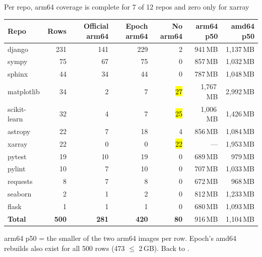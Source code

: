 \begin{frame}{Per repo, arm64 coverage is complete for 7 of 12 repos and zero only for xarray}
\scriptsize\setlength{\tabcolsep}{5pt}
\begin{tabular}{@{}lrrrrrr@{}}
\toprule
\textbf{Repo} & \textbf{Rows} & \textbf{Official arm64} & \textbf{Epoch arm64} & \textbf{No arm64} & \textbf{arm64 p50} & \textbf{amd64 p50}\\
\midrule
django & 231 & 141 & 229 & 2 & 941\,MB & 1,137\,MB\\
sympy & 75 & 67 & 75 & 0 & 857\,MB & 1,032\,MB\\
sphinx & 44 & 34 & 44 & 0 & 787\,MB & 1,048\,MB\\
matplotlib & 34 & 2 & 7 & \hl{27} & 1,767\,MB & 2,992\,MB\\
scikit-learn & 32 & 4 & 7 & \hl{25} & 1,006\,MB & 1,426\,MB\\
astropy & 22 & 7 & 18 & 4 & 856\,MB & 1,084\,MB\\
xarray & 22 & 0 & 0 & \hl{22} & --- & 1,953\,MB\\
pytest & 19 & 10 & 19 & 0 & 689\,MB & 979\,MB\\
pylint & 10 & 7 & 10 & 0 & 707\,MB & 1,033\,MB\\
requests & 8 & 7 & 8 & 0 & 672\,MB & 968\,MB\\
seaborn & 2 & 1 & 2 & 0 & 812\,MB & 1,233\,MB\\
flask & 1 & 1 & 1 & 0 & 680\,MB & 1,093\,MB\\
\midrule
\textbf{Total} & \textbf{500} & \textbf{281} & \textbf{420} & \textbf{80} & 916\,MB & 1,104\,MB\\
\bottomrule
\end{tabular}
\vspace{2mm}

{\scriptsize arm64 p50 = the smaller of the two arm64 images per row. Epoch's amd64 rebuilds also exist for all 500 rows (473 $\le$ 2\,GB). Back to .\par}
\end{frame}

